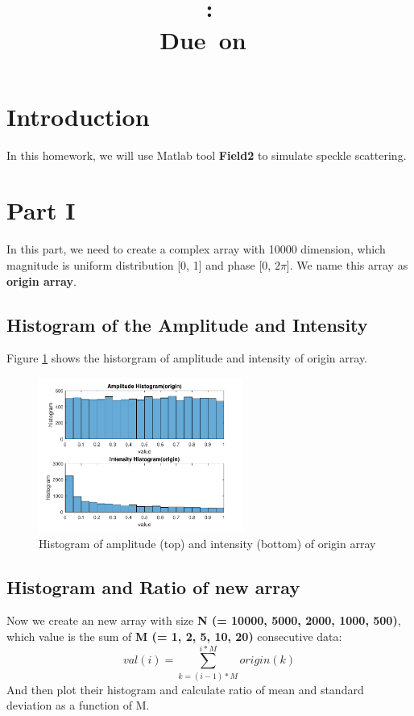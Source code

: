 \documentclass{article}
\title{
    \vspace{2in}
    \textmd{\textbf{\hmwkClass}}\\
    \textmd{\textbf{\hmwkID: \hmwkTitle}} \\
    \normalsize\vspace{0.1in}\small{Due\ on\ \hmwkDueDate}\\
    \vspace{3in}
}
\author{\textbf{\hmwkAuthorName}}
\date{} %
\begin{document}
\maketitle
\newpage

\renewcommand\thesubsection{\thesection.\alph{subsection}}

\section{Introduction}
In this homework, we will use Matlab tool \textbf{Field2} to simulate speckle scattering.

\section{Part \RN{1}}
In this part, we need to create a complex array with 10000 dimension, which magnitude is uniform distribution [0, 1] and phase [0, $2\pi$].
We name this array as \textbf{origin array}.

\subsection{Histogram of the Amplitude and Intensity}
Figure \ref{fig:hist-origin} shows the historgram of amplitude and intensity of origin array.
\begin{figure}[H]
	\centering
	\includegraphics[width = 0.6\textwidth]{src/2pi/hist_origin.pdf}
	\caption{Histogram of amplitude (top) and intensity (bottom) of origin array}
	\label{fig:hist-origin}
\end{figure}

\subsection{Histogram and Ratio of new array}
Now we create an new array with size \textbf{N (= 10000, 5000, 2000, 1000, 500)}, which value is the sum of \textbf{M (= 1, 2, 5, 10, 20)} consecutive data:
$$
	val(i) = \sum_{k = (i-1)*M}^{i*M}{origin(k)}
$$ 
And then plot their histogram and calculate ratio of mean and standard deviation as a function of M. 
\end{document}
